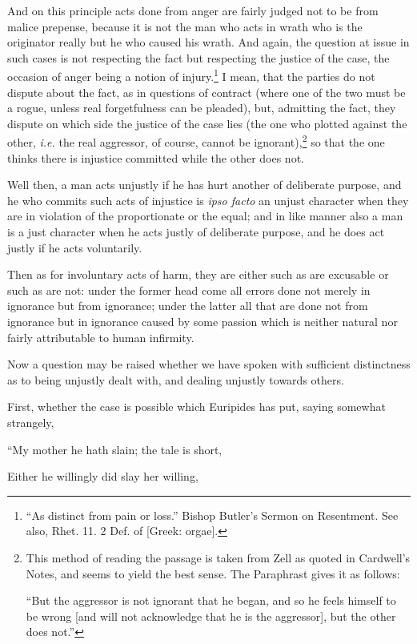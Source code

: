 And on this principle acts done from anger are fairly judged not to be from
malice prepense, because it is not the man who acts in wrath who is the
originator really but he who caused his wrath. And again, the question at issue
in such cases is not respecting the fact but respecting the justice of the
case, the occasion of anger being a notion of injury.\footnote{“As distinct from pain or loss.” Bishop Butler’s Sermon on
Resentment. See also, Rhet. 11. 2 Def. of [Greek: orgae].}
I mean, that the parties do not dispute about the fact, as in questions of
contract (where one of the two must be a rogue, unless real forgetfulness can
be pleaded), but, admitting the fact, they dispute on which side the justice of
the case lies (the one who plotted against the other, \emph{i.e.} the real
aggressor, of course, cannot be ignorant),\footnote{This method of reading the passage is taken from Zell as quoted in
Cardwell’s Notes, and seems to yield the best sense. The Paraphrast gives
it as follows:

“But the aggressor is not ignorant that he began, and so he feels
himself to be wrong [and will not acknowledge that he is the aggressor], but
the other does not.”}
so that the one thinks there is injustice committed while the other
does not.

Well then, a man acts unjustly if he has hurt another of deliberate purpose,
and he who commits such acts of injustice is \emph{ipso facto} an unjust
character when they are in violation of the proportionate or the equal; and in
like manner also a man is a just character when he acts justly of deliberate
purpose, and he does act justly if he acts voluntarily.

Then as for involuntary acts of harm, they are either such as are excusable or
such as are not: under the former head come all errors done not merely in
ignorance but from ignorance; under the latter all that are done not from
ignorance but in ignorance caused by some passion which is neither natural nor
fairly attributable to human infirmity.


Now a question may be raised whether we have spoken with sufficient
distinctness as to being unjustly dealt with, and dealing unjustly towards
others.

First, whether the case is possible which Euripides has put, saying somewhat
strangely,

“My mother he hath slain; the tale is short,

Either he willingly did slay her willing,

